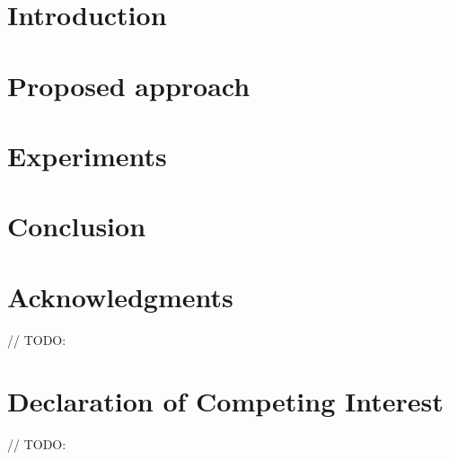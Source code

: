 \documentclass{TST}
\begin{document}
\maketitle


\section{Introduction}

\section{Proposed approach}


\section{Experiments}


\section{Conclusion}


\section*{Acknowledgments}
// TODO:

\section*{Declaration of Competing Interest}
// TODO:



\end{document}
